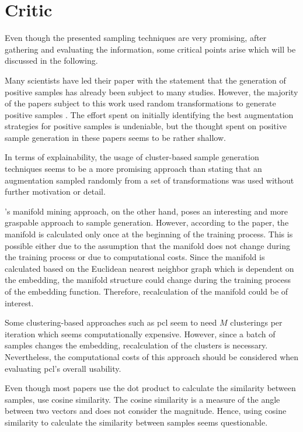 \section{Critic}\label{sec:critic}

Even though the presented sampling techniques are very promising, after gathering and evaluating the information, 
some critical points arise which will be discussed in the following.

Many scientists have led their paper with the statement that the generation of positive samples has already been subject to many studies.
However, the majority of the papers subject to this work used random transformations to generate positive samples \citet{robinson_contrastive_2021,adversarial_2020,swav_2020}.
The effort spent on initially identifying the best augmentation strategies for positive samples is undeniable, 
but the thought spent on positive sample generation in these papers seems to be rather shallow.

In terms of explainability, 
the usage of cluster-based sample generation techniques seems to be a more promising approach than stating that an augmentation sampled randomly 
from a set of transformations was used without further motivation or detail.

\citet{mining_manifolds_2018}'s manifold mining approach, on the other hand, poses an interesting and more graspable approach to sample generation. 
However, according to the paper, the manifold is calculated only once at the beginning of the training process.
This is possible either due to the assumption that the manifold does not change during the training process or 
due to computational costs.
Since the manifold is calculated based on the Euclidean nearest neighbor graph which is dependent on the embedding, 
the manifold structure could change during the training process of the embedding function.
Therefore, recalculation of the manifold could be of interest.

Some clustering-based approaches such as \ac{pcl} \citet{PCL_2021} seem to need $M$ clusterings per iteration 
which seems computationally expensive. 
However, since a batch of samples changes the embedding, recalculation of the clusters is necessary.
Nevertheless, the computational costs of this approach should be considered when evaluating \ac{pcl}'s overall usability.

Even though most papers use the dot product to calculate the similarity between samples, 
\citet{mining_potential_2024} use cosine similarity.
The cosine similarity is a measure of the angle between two vectors and does not consider the magnitude.
Hence, using cosine similarity to calculate the similarity between samples seems questionable.

